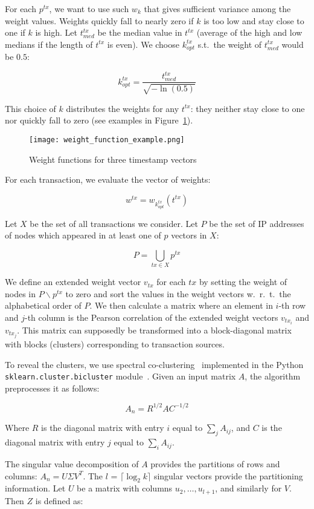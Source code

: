 For each $p^{tx}$, we want to use such $w_k$ that gives sufficient variance among the weight values.
Weights quickly fall to nearly zero if $k$ is too low and stay close to one if $k$ is high.
Let $t^{tx}_{med}$ be the median value in $t^{tx}$ (average of the high and low medians if the length of $t^{tx}$ is even).
We choose $k^{tx}_{opt}$ s.t.~the weight of $t^{tx}_{med}$ would be $0.5$:

\[
k^{tx}_{opt} = \frac{t^{tx}_{med}}{\sqrt{-\ln(0.5)}}
\]

This choice of $k$ distributes the weights for any $t^{tx}$: they neither stay close to one nor quickly fall to zero (see examples in Figure~\ref{fig:weight}).
\begin{figure}
	\centering
	\texttt{[image: weight\_function\_example.png]}
	\caption{Weight functions for three timestamp vectors}\label{fig:weight}
\end{figure}
For each transaction, we evaluate the vector of weights:

\[
w^{tx} = w_{k^{tx}_{opt}}(t^{tx})
\]

Let $X$ be the set of all transactions we consider.
Let $P$ be the set of IP addresses of nodes which appeared in at least one of $p$ vectors in $X$:

\[
P = \bigcup\limits_{tx \in X} p^{tx}
\]

We define an extended weight vector $v_{tx}$ for each $tx$ by setting the weight of nodes in $P \backslash p^{tx}$ to zero and sort the values in the weight vectors w.~r.~t.~the alphabetical order of $P$.
We then calculate a matrix where an element in $i$-th row and $j$-th column is the Pearson correlation of the extended weight vectors $v_{tx_i}$ and $v_{tx_j}$.
This matrix can supposedly be transformed into a block-diagonal matrix with blocks (clusters) corresponding to transaction sources.

To reveal the clusters, we use spectral co-clustering~\cite{Dhillon2001} implemented in the Python \texttt{sklearn.cluster.bicluster} module~\cite{scikitlearn2018}.
Given an input matrix $A$, the algorithm preprocesses it as follows:

\[
A_n = R^{1/2}AC^{-1/2}
\]

Where $R$ is the diagonal matrix with entry $i$ equal to $\sum_{j} A_{ij}$, and $C$ is the diagonal matrix with entry $j$ equal to $\sum_{i} A_{ij}$.

The singular value decomposition of $A$ provides the partitions of rows and columns: $A_{n}=U \Sigma V^{T}$.
The $l$ = $\lceil \log_2 k \rceil$ singular vectors provide the partitioning information.
Let $U$ be a matrix with columns $u_2,\dots,u_{l+1}$, and similarly for $V$.
Then $Z$ is defined as:

